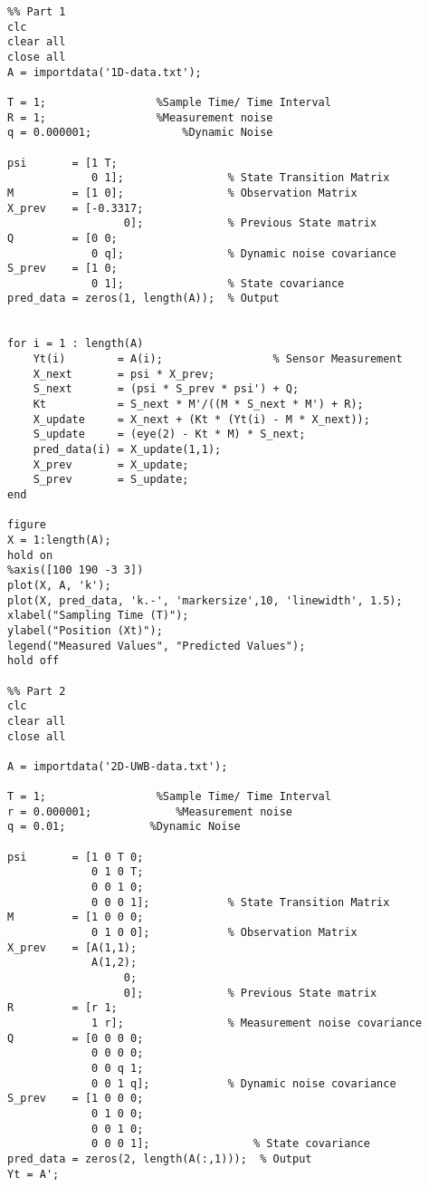 \documentclass[12pt]{article}
\begin{document}
\begin{verbatim}
%% Part 1
clc
clear all
close all
A = importdata('1D-data.txt');

T = 1;                 %Sample Time/ Time Interval
R = 1;                 %Measurement noise
q = 0.000001;              %Dynamic Noise

psi       = [1 T;
             0 1];                % State Transition Matrix
M         = [1 0];                % Observation Matrix
X_prev    = [-0.3317; 
                  0];             % Previous State matrix
Q         = [0 0; 
             0 q];                % Dynamic noise covariance
S_prev    = [1 0; 
             0 1];                % State covariance
pred_data = zeros(1, length(A));  % Output


for i = 1 : length(A)
    Yt(i)        = A(i);                 % Sensor Measurement
    X_next       = psi * X_prev;
    S_next       = (psi * S_prev * psi') + Q;
    Kt           = S_next * M'/((M * S_next * M') + R);
    X_update     = X_next + (Kt * (Yt(i) - M * X_next));
    S_update     = (eye(2) - Kt * M) * S_next;
    pred_data(i) = X_update(1,1);
    X_prev       = X_update;
    S_prev       = S_update;
end 

figure
X = 1:length(A);
hold on
%axis([100 190 -3 3])
plot(X, A, 'k');
plot(X, pred_data, 'k.-', 'markersize',10, 'linewidth', 1.5);
xlabel("Sampling Time (T)");
ylabel("Position (Xt)");
legend("Measured Values", "Predicted Values");
hold off

%% Part 2
clc
clear all
close all

A = importdata('2D-UWB-data.txt');

T = 1;                 %Sample Time/ Time Interval
r = 0.000001;             %Measurement noise
q = 0.01;             %Dynamic Noise

psi       = [1 0 T 0;
             0 1 0 T;
             0 0 1 0;
             0 0 0 1];            % State Transition Matrix
M         = [1 0 0 0;
             0 1 0 0];            % Observation Matrix
X_prev    = [A(1,1); 
             A(1,2);
                  0;
                  0];             % Previous State matrix
R         = [r 1;
             1 r];                % Measurement noise covariance
Q         = [0 0 0 0; 
             0 0 0 0; 
             0 0 q 1; 
             0 0 1 q];            % Dynamic noise covariance
S_prev    = [1 0 0 0; 
             0 1 0 0;
             0 0 1 0;
             0 0 0 1];                % State covariance
pred_data = zeros(2, length(A(:,1)));  % Output
Yt = A';


\end{verbatim}
\end{document}
